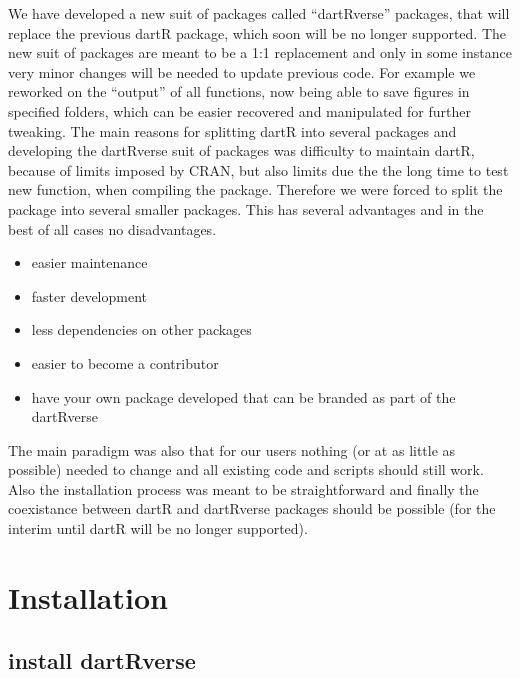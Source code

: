 \documentclass[
  letterpaper,
  DIV=11,
  numbers=noendperiod]{scrreprt}
\providecommand{\tightlist}{%
  \setlength{\itemsep}{0pt}\setlength{\parskip}{0pt}}\usepackage{longtable,booktabs,array}
\begin{document}

We have developed a new suit of packages called ``dartRverse'' packages,
that will replace the previous dartR package, which soon will be no
longer supported. The new suit of packages are meant to be a 1:1
replacement and only in some instance very minor changes will be needed
to update previous code. For example we reworked on the ``output'' of
all functions, now being able to save figures in specified folders,
which can be easier recovered and manipulated for further tweaking. The
main reasons for splitting dartR into several packages and developing
the dartRverse suit of packages was difficulty to maintain dartR,
because of limits imposed by CRAN, but also limits due the the long time
to test new function, when compiling the package. Therefore we were
forced to split the package into several smaller packages. This has
several advantages and in the best of all cases no disadvantages.

\begin{itemize}
\tightlist
\item
  easier maintenance
\item
  faster development
\item
  less dependencies on other packages
\item
  easier to become a contributor
\item
  have your own package developed that can be branded as part of the
  dartRverse
\end{itemize}

The main paradigm was also that for our users nothing (or at as little
as possible) needed to change and all existing code and scripts should
still work. Also the installation process was meant to be
straightforward and finally the coexistance between dartR and dartRverse
packages should be possible (for the interim until dartR will be no
longer supported).

\hypertarget{installation}{%
\section*{Installation}\label{installation}}


\hypertarget{install-dartrverse}{%
\subsection*{install dartRverse}\label{install-dartrverse}}
\end{document}
